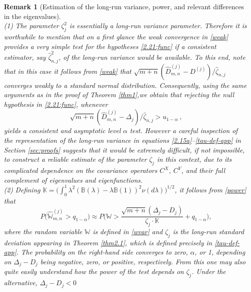 \documentclass[11pt]{article}
\newtheorem{rem}{Remark}[section]
\numberwithin{equation}{section}
\numberwithin{theorem}{section}
\numberwithin{lemma}{section}
\numberwithin{proposition}{section}
\numberwithin{cor}{section}
\numberwithin{definition}{section}
\numberwithin{cons}{section}
\numberwithin{rem}{section}
\numberwithin{exa}{section}
\numberwithin{table}{section}
\numberwithin{figure}{section}
\numberwithin{algo}{section}
\begin{document}
{{\begin{rem}[Estimation of the long-run variance, power, and  relevant differences in the eigenvalues]\label{eig-rem}
{\rm ~\\
(1)  The parameter $\zeta_j^{2}$ is essentially a long-run variance parameter. Therefore  it is worthwhile to mention that  on a first glance the weak convergence  in \eqref{weak}  provides a very simple test for the hypotheses  \eqref{2.21:func} if a consistent estimator, say $\hat \zeta_{n,j}^{2}$, of
 the  long-run variance would be   available. To this end, note that in this case it follows from \eqref{weak}  that
$ \sqrt{m+n} ( {\hat D^{(j)}_{m,n}- D^{(j)}} ) / \hat \zeta_{n,j  }$ converges weakly to a standard normal distribution. Consequently, using the same arguments as in the proof
of Theorem \ref{thm1},we obtain  that  rejecting the null hypothesis in \eqref{2.21:func}, whenever
\begin{equation}\label{testlrv}
 \sqrt{m+n} ( \hat D^{(j)}_{m,n}-  \Delta_{j} ) / \hat \zeta_{n,j  } >  u_{1 - \alpha}~,
  \end{equation}
  yields a consistent and asymptotic level $\alpha$ test. However a careful inspection of the representation of the long-run variance
  in equations \eqref{2.15a}--\eqref{tau-def-app} in Section \ref{sec:proofs} suggests that it would be extremely difficult, if not impossible, to construct a reliable estimate of  the parameter $\zeta_j$ in this context, due to its complicated dependence on the covariance operators $C^X$, $C^Y$, and their full complement of eigenvalues and eigenfunctions.
\\
(2)
 Defining  $\mathbb{K}=\big (\int_{0}^{1} \lambda^2(\mathbb{B}(\lambda)-\lambda \mathbb{B}(1))^2 \nu(d\lambda)\big)^{1/2}$, it follows from
\eqref{power} that
\begin{equation}\label{power-w}
P\big ( \hat{\mathbb{W}}^{(j)}_{m,n}  > q_{1 - \alpha} \big ) \approx P\Big ({\mathbb{W}} > \frac{\sqrt{m+n}(\Delta_j - D_j)}{\zeta_j  \cdot \mathbb{K} } +   q_{1 - \alpha}\Big ),
\end{equation}
where the random variable $\mathbb{W} $ is defined in \eqref{wvar} and
$\zeta_j$ is the long-run standard deviation appearing in Theorem \ref{thm2.1}, which is defined precisely in  \eqref{tau-def-app}. The probability  on the  right-hand side converges to zero, $\alpha$, or 1, depending on $\Delta_j-D_j$ being negative, zero, or positive, respectively. From this one may  also quite easily understand how the power of the test depends on $\zeta_j$.   Under the alternative,  $\Delta_j - D_j < 0 $
}
\end{rem}}}
\end{document}
